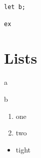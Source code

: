 \documentclass[11pt]{article}
\begin{document}
\begin{verbatim}
let b;
\end{verbatim}

\begin{verbatim}
ex
\end{verbatim}
\section{Lists}
\label{sec:org723479e}
\begin{enumerate*}
\item a
\item b
\end{enumerate*}

\begin{enumerate}[label=\alph*)]
\item one
\item two
\end{enumerate}

\begin{itemize}[noitemsep]
\item tight
\end{itemize}
\end{document}
